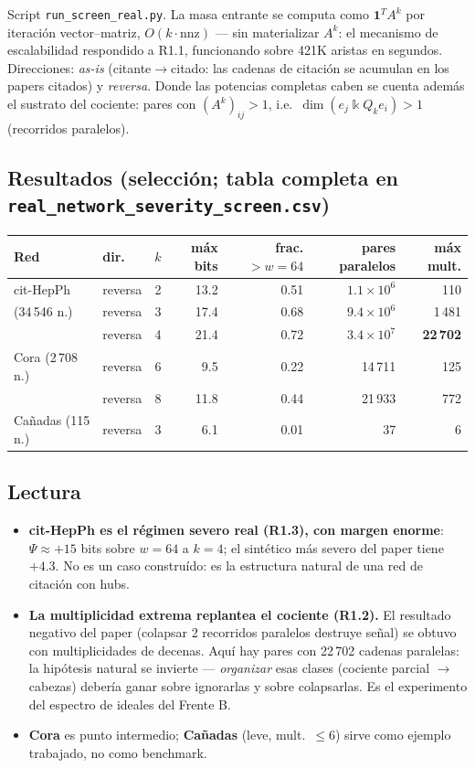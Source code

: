 \documentclass[11pt]{article}
\newcommand{\kk}{\Bbbk}
\newcommand{\kQ}{\kk Q}
\begin{document}
Script \texttt{run\_screen\_real.py}. La masa entrante se computa como
$\mathbf{1}^{T}A^{k}$ por iteraci\'on vector--matriz, $O(k\cdot\mathrm{nnz})$
--- sin materializar $A^k$: el mecanismo de escalabilidad respondido a R1.1,
funcionando sobre 421K aristas en segundos. Direcciones: \emph{as-is}
(citante$\to$citado: las cadenas de citaci\'on se acumulan en los papers
citados) y \emph{reversa}. Donde las potencias completas caben se cuenta
adem\'as el sustrato del cociente: pares con $(A^k)_{ij}>1$, i.e.\
$\dim(e_j\kQ_k e_i)>1$ (recorridos paralelos).

\subsection{Resultados (selecci\'on; tabla completa en
\texttt{real\_network\_severity\_screen.csv})}

\begin{center}\small
\begin{tabular}{llrrrrr}
\toprule
\textbf{Red} & \textbf{dir.} & $k$ & \textbf{m\'ax bits} &
\textbf{frac.}$>w{=}64$ & \textbf{pares paralelos} & \textbf{m\'ax mult.}\\
\midrule
cit-HepPh & reversa & 2 & 13.2 & 0.51 & $1.1\times10^{6}$ & 110\\
(34\,546 n.) & reversa & 3 & 17.4 & 0.68 & $9.4\times10^{6}$ & 1\,481\\
 & reversa & 4 & 21.4 & 0.72 & $3.4\times10^{7}$ & \textbf{22\,702}\\
Cora (2\,708 n.) & reversa & 6 & 9.5 & 0.22 & 14\,711 & 125\\
 & reversa & 8 & 11.8 & 0.44 & 21\,933 & 772\\
Ca\~nadas (115 n.) & reversa & 3 & 6.1 & 0.01 & 37 & 6\\
\bottomrule
\end{tabular}
\end{center}

\subsection{Lectura}

\begin{itemize}
  \item \textbf{cit-HepPh es el r\'egimen severo real (R1.3), con margen
  enorme}: $\Psi\approx+15$ bits sobre $w{=}64$ a $k{=}4$; el sint\'etico
  m\'as severo del paper tiene $+4.3$. No es un caso constru\'ido: es la
  estructura natural de una red de citaci\'on con hubs.
  \item \textbf{La multiplicidad extrema replantea el cociente (R1.2).} El
  resultado negativo del paper (colapsar 2 recorridos paralelos destruye
  se\~nal) se obtuvo con multiplicidades de decenas. Aqu\'i hay pares con
  22\,702 cadenas paralelas: la hip\'otesis natural se invierte ---
  \emph{organizar} esas clases (cociente parcial $\to$ cabezas) deber\'ia
  ganar sobre ignorarlas y sobre colapsarlas. Es el experimento del espectro
  de ideales del Frente B.
  \item \textbf{Cora} es punto intermedio; \textbf{Ca\~nadas} (leve, mult.\
  $\le6$) sirve como ejemplo trabajado, no como benchmark.
\end{itemize}
\end{document}
